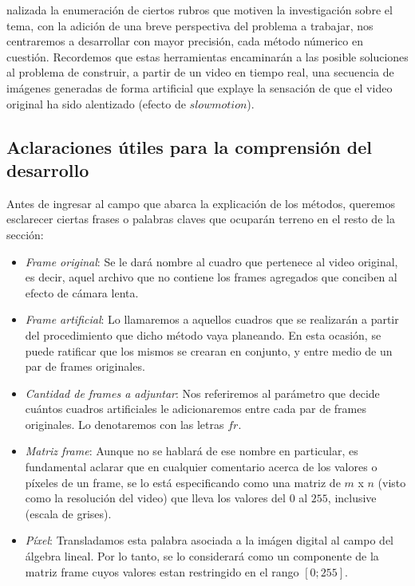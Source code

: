 \par {}nalizada la enumeraci\'on de ciertos rubros que motiven la investigaci\'on sobre el tema, con la adici\'on de una breve perspectiva del problema a trabajar, nos centraremos a desarrollar con mayor precisi\'on, cada m\'etodo n\'umerico en cuesti\'on. Recordemos que estas herramientas encaminar\'an a las posible soluciones al problema de construir, a partir de un video en tiempo real, una secuencia de im\'agenes generadas de forma artificial que explaye la sensaci\'on de que el video original ha sido alentizado (efecto de $slowmotion$).

\subsection{Aclaraciones \'utiles para la comprensi\'on del desarrollo}

Antes de ingresar al campo que abarca la explicaci\'on de los m\'etodos, queremos esclarecer ciertas frases o palabras claves que ocupar\'an terreno en el resto de la secci\'on:

\begin{itemize}
	\item \textit{Frame original}: Se le dar\'a nombre al cuadro que pertenece al video original, es decir, aquel archivo que no contiene los frames agregados que conciben al efecto de c\'amara lenta.
	\item \textit{Frame artificial}: Lo llamaremos a aquellos cuadros que se realizar\'an a partir del procedimiento que dicho m\'etodo vaya planeando. En esta ocasi\'on, se puede ratificar que los mismos se crearan en conjunto, y entre medio de un par de frames originales.
	\item \textit{Cantidad de frames a adjuntar}: Nos referiremos al par\'ametro que decide cu\'antos cuadros artificiales le adicionaremos entre cada par de frames originales. Lo denotaremos con las letras $fr$.
	\item \textit{Matriz frame}: Aunque no se hablar\'a de ese nombre en particular, es fundamental aclarar que en cualquier comentario acerca de los valores o p\'ixeles de un frame, se lo est\'a especificando como una matriz de $m$ x $n$ (visto como la resoluci\'on del video) que lleva los valores del $0$ al $255$, inclusive (escala de grises).
	\item \textit{P\'ixel}: Transladamos esta palabra asociada a la im\'agen digital al campo del \'algebra lineal. Por lo tanto, se lo considerar\'a como un componente de la matriz frame cuyos valores estan restringido en el rango $[0;255]$.
\end{itemize}

